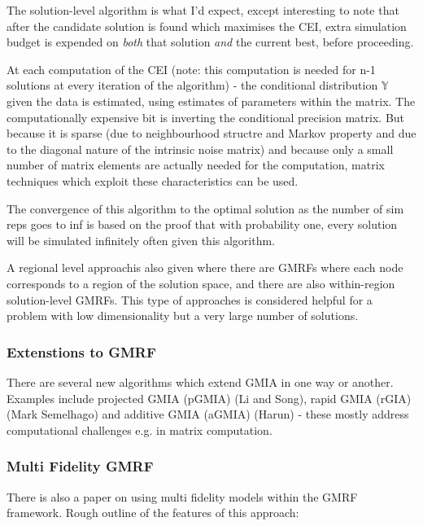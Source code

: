 \message{ !name(SO-Methods.tex)}\documentclass{article}
\begin{document}
The solution-level algorithm is what I'd expect, except interesting to note that after the candidate solution is found which maximises the CEI, extra simulation budget is expended on \emph{both} that solution \emph{and} the current best, before proceeding. \newline

At each computation of the CEI (note: this computation is needed for n-1 solutions at every iteration of the algorithm) - the conditional distribution $\mathbb{Y}$ given the data is estimated, using estimates of parameters within the matrix. The computationally expensive bit is inverting the conditional precision matrix. But because it is sparse (due to neighbourhood structre and Markov property and due to the diagonal nature of the intrinsic noise matrix) and because only a small number of matrix elements are actually needed for the computation, matrix techniques which exploit these characteristics can be used. \newline

The convergence of this algorithm to the optimal solution as the number of sim reps goes to inf is based on the proof that with probability one, every solution will be simulated infinitely often given this algorithm.  \newline

A regional level approachis also given where there are GMRFs where each node corresponds to a region of the solution space, and there are also within-region solution-level GMRFs. This type of approaches is considered helpful for a problem with low dimensionality but a very large number of solutions. \newline

\subsubsection{Extenstions to GMRF}

There are several new algorithms which extend GMIA in one way or another. Examples include projected GMIA (pGMIA) (Li and Song), rapid GMIA (rGIA) (Mark Semelhago) and additive GMIA (aGMIA) (Harun) - these mostly address computational challenges e.g. in matrix computation.

\subsubsection{Multi Fidelity GMRF}

There is also a paper on using multi fidelity models within the GMRF framework. Rough outline of the features of this approach:
\end{document}
